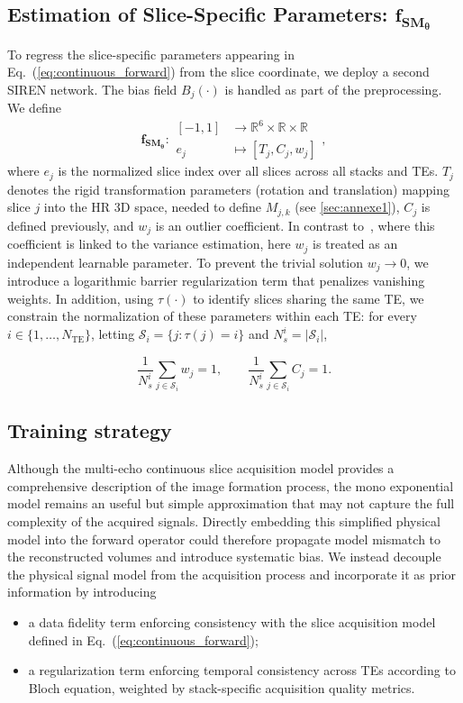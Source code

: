 \documentclass[preprint,authoryear,12pt]{elsarticle}
\begin{document}
\subsection{Estimation of Slice-Specific Parameters: $\mathbf{f_{SM_{\theta}}}$}
To regress the slice-specific parameters appearing in Eq.~(\ref{eq:continuous_forward}) from the slice coordinate, we deploy a second SIREN network. The bias field $B_j(\cdot)$ is handled as part of the preprocessing. We define
\[ \mathbf{f_{{SM}_{\theta}}} : \begin{aligned} [-1,1] &\to \mathbb{R}^{6} \times \mathbb{R} \times \mathbb{R} \\ e_j &\mapsto [T_j, C_j, w_j] \end{aligned}, \]
where $e_j$ is the normalized slice index over all slices across all stacks and TEs. $T_j$ denotes the rigid transformation parameters (rotation and translation) mapping slice $j$ into the HR 3D space, needed to define $M_{j,k}$ (see \ref{sec:annexe1}), $C_j$ is defined previously, and $w_j$ is an outlier coefficient. %
In contrast to~\cite{xu_nesvor_2023}, where this coefficient is linked to the variance estimation, here $w_j$ is treated as an independent learnable parameter. To prevent the trivial solution $w_j \to 0$, we introduce a logarithmic barrier regularization term \citep{boyd2004convex} that penalizes vanishing weights. In addition, using $\tau(\cdot)$ to identify slices sharing the same TE, we constrain the normalization of these parameters within each TE: for every $i \in \{1,\dots,N_{\mathrm{TE}}\}$, letting $\mathcal{S}_i = \{j : \tau(j) = i\}$ and $N_s^i = |\mathcal{S}_i|$,

\[
\frac{1}{N_s^i}\sum_{j \in \mathcal{S}_i} w_j = 1, \qquad \frac{1}{N_s^i}\sum_{j \in \mathcal{S}_i} C_j = 1.
\]


\subsection{Training strategy}

Although the multi-echo continuous slice acquisition model provides a comprehensive description of the image formation process, the mono exponential model remains an useful but simple approximation that may not capture the full complexity of the acquired signals. Directly embedding this simplified physical model into the forward operator could therefore propagate model mismatch to the reconstructed volumes and introduce systematic bias. We instead decouple the physical signal model from the acquisition process and incorporate it as prior information by introducing
\begin{itemize}
    \item a data fidelity term enforcing consistency with the slice acquisition model defined in Eq.~(\ref{eq:continuous_forward});
    \item a regularization term enforcing temporal consistency across TEs according to Bloch equation, weighted by stack-specific acquisition quality metrics.
\end{itemize}
\end{document}
